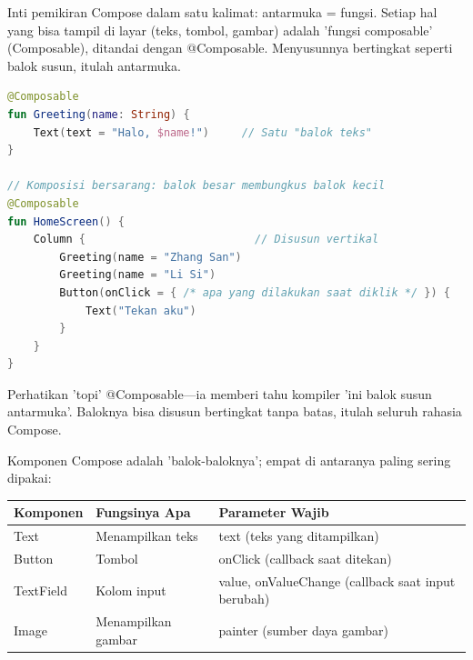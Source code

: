 


Inti pemikiran Compose dalam satu kalimat: antarmuka = fungsi. Setiap hal yang bisa tampil di layar (teks, tombol, gambar) adalah 'fungsi composable' (Composable), ditandai dengan @Composable. Menyusunnya bertingkat seperti balok susun, itulah antarmuka.

\begin{lstlisting}[language=Kotlin]
@Composable
fun Greeting(name: String) {
    Text(text = "Halo, $name!")     // Satu "balok teks"
}

// Komposisi bersarang: balok besar membungkus balok kecil
@Composable
fun HomeScreen() {
    Column {                          // Disusun vertikal
        Greeting(name = "Zhang San")
        Greeting(name = "Li Si")
        Button(onClick = { /* apa yang dilakukan saat diklik */ }) {
            Text("Tekan aku")
        }
    }
}
\end{lstlisting}

Perhatikan 'topi' @Composable—ia memberi tahu kompiler 'ini balok susun antarmuka'. Baloknya bisa disusun bertingkat tanpa batas, itulah seluruh rahasia Compose.


Komponen Compose adalah 'balok-baloknya'; empat di antaranya paling sering dipakai:

\begin{center}
\begin{tabularx}{\linewidth}{|X|X|X|}
\hline
\textbf{Komponen} & \textbf{Fungsinya Apa} & \textbf{Parameter Wajib} \tabularnewline
\hline
Text & Menampilkan teks & text (teks yang ditampilkan) \tabularnewline
Button & Tombol & onClick (callback saat ditekan) \tabularnewline
TextField & Kolom input & value, onValueChange (callback saat input berubah) \tabularnewline
Image & Menampilkan gambar & painter (sumber daya gambar) \tabularnewline
\hline
\end{tabularx}
\end{center}

